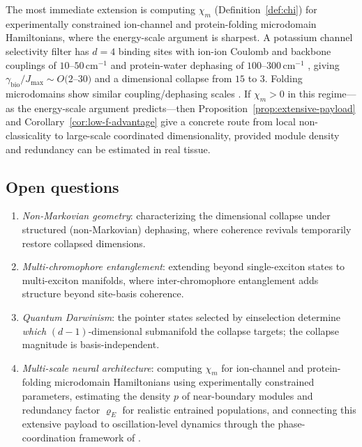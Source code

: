 \documentclass[12pt,a4paper]{article}
\theoremstyle{definition}
\theoremstyle{remark}
\begin{document}
The most immediate extension is computing $\chi_m$ (Definition~\ref{def:chi}) for experimentally constrained ion-channel and protein-folding microdomain Hamiltonians, where the energy-scale argument is sharpest. A potassium channel selectivity filter has $d = 4$ binding sites with ion-ion Coulomb and backbone couplings of $10$--$50$\,cm$^{-1}$ and protein-water dephasing of $100$--$300$\,cm$^{-1}$ \cite{hamm2011concepts}, giving $\gamma_{\mathrm{bio}}/J_{\max} \sim O(2$--$30)$ and a dimensional collapse from $15$ to $3$. Folding microdomains show similar coupling/dephasing scales \cite{onuchic1997theory,dill2008protein}. If $\chi_m > 0$ in this regime---as the energy-scale argument predicts---then Proposition~\ref{prop:extensive-payload} and Corollary~\ref{cor:low-f-advantage} give a concrete route from local non-classicality to large-scale coordinated dimensionality, provided module density and redundancy can be estimated in real tissue.

\subsection{Open questions}

\begin{enumerate}
\item \emph{Non-Markovian geometry}: characterizing the dimensional collapse under structured (non-Markovian) dephasing, where coherence revivals temporarily restore collapsed dimensions.
\item \emph{Multi-chromophore entanglement}: extending beyond single-exciton states to multi-exciton manifolds, where inter-chromophore entanglement adds structure beyond site-basis coherence.
\item \emph{Quantum Darwinism}: the pointer states selected by einselection \cite{zurek2003decoherence,zurek2025decoherence} determine \emph{which} $(d{-}1)$-dimensional submanifold the collapse targets; the collapse magnitude is basis-independent.
\item \emph{Multi-scale neural architecture}: computing $\chi_m$ for ion-channel and protein-folding microdomain Hamiltonians using experimentally constrained parameters, estimating the density $p$ of near-boundary modules and redundancy factor $\varrho_E$ for realistic entrained populations, and connecting this extensive payload to oscillation-level dynamics through the phase-coordination framework of \cite{todd2026coherence}.
\end{enumerate}
\end{document}
